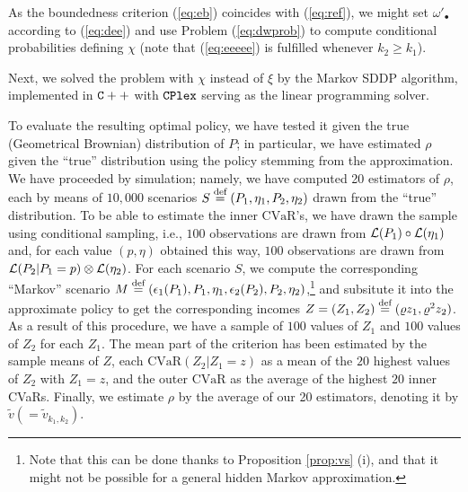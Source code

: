 \documentclass{article}              %
\begin{document}
As the boundedness criterion (\ref{eq:eb}) coincides
with (\ref{eq:ref}), we might set $\omega'_{\bullet}$ according
to (\ref{eq:dee}) and use Problem (\ref{eq:dwprob}) to compute conditional
probabilities defining $\chi$ (note that (\ref{eq:eeeee}) is fulfilled
whenever $k_{2}\geq k_{1}$).

\def\CVaR{\mathrm{CVaR}}

Next, we solved the problem with $\chi$ instead of $\xi$ by the Markov SDDP
algorithm, implemented in ${\tt C++}$ with ${\tt CPlex}$ serving as the
linear programming solver. 

To evaluate the resulting optimal policy, we have tested it given the true (Geometrical
Brownian) distribution of $P$; in particular, we have estimated $\rho$ given the ``true'' distribution  using the policy stemming from the approximation. We have proceeded by simulation; namely, we 
have computed 20 estimators of $\rho$, each by means of $10,000$ scenarios $S\stackrel{\text{\rm def}}{=}(P_{1},\eta_{1},P_{2},\eta_{2})$ drawn from the ``true'' distribution. To be able to estimate the inner $\CVaR$'s, we have drawn the sample using conditional sampling, i.e., $100$ observations are drawn from $\mathcal{L}(P_1)\circ\mathcal{L}(\eta_1)$ and, for each value $(p,\eta)$ obtained this way, $100$ observations are drawn from $\mathcal{L}(P_2|P_1=p)\otimes\mathcal{L}(\eta_2)$. For each scenario $S$, we compute the corresponding ``Markov'' scenario $M\stackrel{\text{\rm def}}{=} (\epsilon_{1}(P_{1}),P_{1},\eta_{1},\epsilon_{2}(P_{2}),P_{2},\eta_{2})$,\footnote{Note that this can be done thanks to Proposition \ref{prop:vs} (i), and that it might not be possible for a general hidden Markov approximation.} and subsitute it into the approximate policy to get the corresponding incomes $Z=(Z_1,Z_2)\stackrel{\text{\rm def}}{=} (\varrho z_1, \varrho^2 z_2)$. As a result of this procedure, we have a sample of $100$ values of $Z_1$ and $100$ values of $Z_2$ for each $Z_1$. The mean part of the criterion has been estimated by the sample means of $Z$, each $\CVaR(Z_2|Z_1=z)$ as a mean of the $20$ highest values of $Z_2$ with $Z_1=z$, and the outer $\CVaR$ as the average of the highest $20$ inner CVaRs. Finally, we estimate $\rho$ by the average of our 20 estimators, denoting it by $\tilde v(=\tilde v_{k_1,k_2})$.
\end{document}
